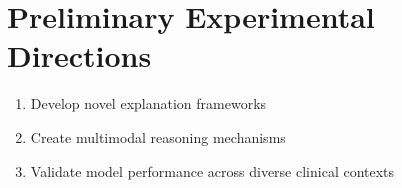 \section{Preliminary Experimental Directions}
\begin{enumerate}
    \item Develop novel explanation frameworks
    \item Create multimodal reasoning mechanisms
    \item Validate model performance across diverse clinical contexts
\end{enumerate}

